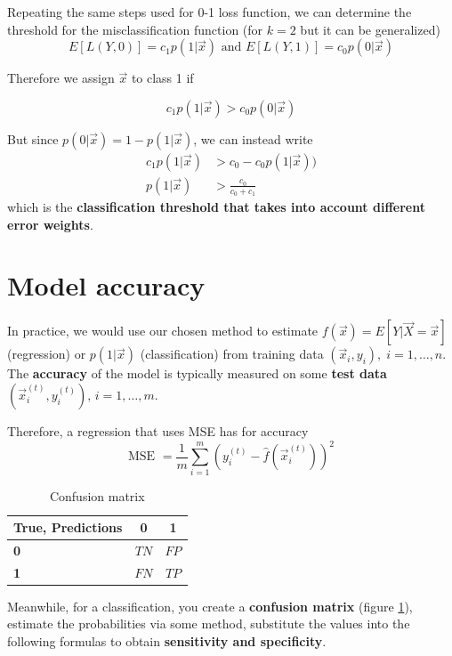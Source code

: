     Repeating the same steps used for 0-1 loss function, we can determine the threshold for the misclassification function (for $k=2$ but it can be generalized)
    $$E[L(Y,0)] = c_1 p(1|\vec{x}) \text{ and } E[L(Y,1)] = c_0 p(0|\vec{x})$$
  
    Therefore we assign $\vec{x}$ to class 1 if 

    $$c_1 p(1|\vec{x}) > c_0 p(0|\vec{x})$$

    But since $p(0|\vec{x}) = 1 - p(1|\vec{x})$, we can instead write
    \begin{align*}
    c_1 p(1|\vec{x}) &> c_0 - c_0 p(1|\vec{x})) \\
    p(1|\vec{x}) &> \frac{c_0}{c_0 + c_1}
    \end{align*}
    which is the \textbf{classification threshold that takes into account different error weights}.

  \section{Model accuracy}
    In practice, we would use our chosen method to estimate $f(\vec{x})=E[Y|\vec{X}=\vec{x}]$ (regression) or $p(1|\vec{x})$ (classification) from training data $(\vec{x}_i, y_i), \; i = 1, \dots, n$.
    The \textbf{accuracy} of the model is typically measured on some \textbf{test data}
    $(\vec{x}_i^{(t)}, y_i^{(t)}), \, i = 1, \dots, m $.

    Therefore, a regression that uses MSE has for accuracy
    $$\text{MSE } = \frac{1}{m} \sum_{i = 1}^{m}\left(y_i^{(t)} - 
                    \hat{f}\left(\vec{x}_i^{(t)}\right)\right)^2$$
    
    
\begin{table}
\centering
\begin{tabular}{|l||c|c|}
	\hline
	\textbf{True,
		Predictions} & \textbf{0} & \textbf{1} \\
	\hline
	\hline
	\textbf{0} &  $ TN $ & $ FP $ \\
	\hline
	\textbf{\textbf{1}} & $ FN $ & $ TP $ \\
	\hline
\end{tabular}
\caption{Confusion matrix}
\label{ConfMat}
\end{table} 

    Meanwhile, for a classification, you create a \textbf{confusion matrix} (figure \ref{ConfMat}), estimate the probabilities via some method, substitute the values into the following formulas to obtain \textbf{sensitivity and specificity}.
     
